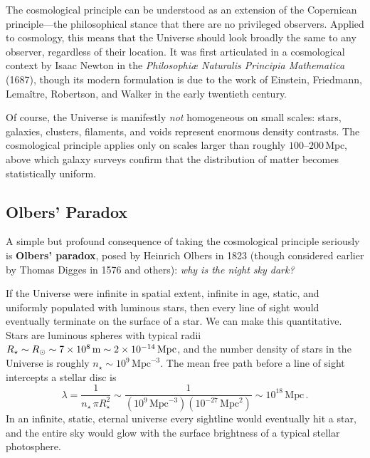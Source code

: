 The cosmological principle can be understood as an extension of the Copernican principle---the philosophical stance that there are no privileged observers. Applied to cosmology, this means that the Universe should look broadly the same to any observer, regardless of their location. It was first articulated in a cosmological context by Isaac Newton in the \textit{Philosophi\ae{} Naturalis Principia Mathematica} (1687), though its modern formulation is due to the work of Einstein, Friedmann, Lema\^{i}tre, Robertson, and Walker in the early twentieth century.

Of course, the Universe is manifestly \emph{not} homogeneous on small scales: stars, galaxies, clusters, filaments, and voids represent enormous density contrasts. The cosmological principle applies only on scales larger than roughly $100$--$200\,\mathrm{Mpc}$, above which galaxy surveys confirm that the distribution of matter becomes statistically uniform.

\subsection{Olbers' Paradox}
\label{sec:olbers}

A simple but profound consequence of taking the cosmological principle seriously is \textbf{Olbers' paradox}, posed by Heinrich Olbers in 1823 (though considered earlier by Thomas Digges in 1576 and others): \textit{why is the night sky dark?}

If the Universe were infinite in spatial extent, infinite in age, static, and uniformly populated with luminous stars, then every line of sight would eventually terminate on the surface of a star. We can make this quantitative. Stars are luminous spheres with typical radii $R_{\star}\sim R_{\odot}\sim 7\times 10^{8}\,\mathrm{m}\sim 2\times 10^{-14}\,\mathrm{Mpc}$, and the number density of stars in the Universe is roughly $n_{\star}\sim 10^{9}\,\mathrm{Mpc}^{-3}$. The mean free path before a line of sight intercepts a stellar disc is
\begin{equation}
\boxed{\lambda = \frac{1}{n_{\star}\,\pi R_{\star}^2} \sim \frac{1}{(10^{9}\,\mathrm{Mpc}^{-3})(10^{-27}\,\mathrm{Mpc}^2)} \sim 10^{18}\,\mathrm{Mpc}\,.}
\label{eq:olbers_mfp}
\end{equation}
In an infinite, static, eternal universe every sightline would eventually hit a star, and the entire sky would glow with the surface brightness of a typical stellar photosphere.

